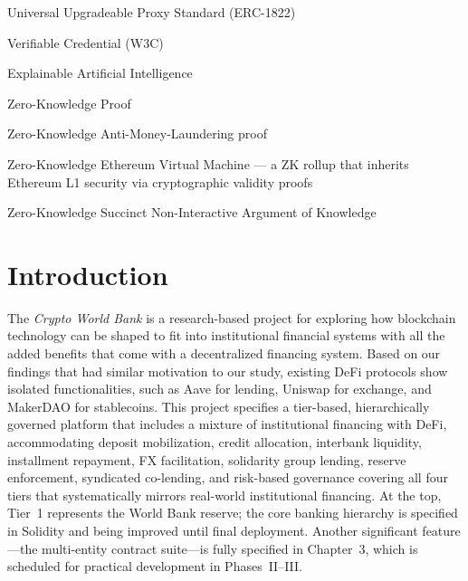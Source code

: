 \documentclass[12pt, a4paper]{report}
\begin{document}
\begin{description}[leftmargin=0pt]
    \item[UUPS:] Universal Upgradeable Proxy Standard (ERC-1822)
    \item[VC:] Verifiable Credential (W3C)
    \item[XAI:] Explainable Artificial Intelligence
    \item[ZKP:] Zero-Knowledge Proof
    \item[zkAML:] Zero-Knowledge Anti-Money-Laundering proof
    \item[zkEVM:] Zero-Knowledge Ethereum Virtual Machine --- a ZK rollup that inherits Ethereum L1 security via cryptographic validity proofs
    \item[zk-SNARK:] Zero-Knowledge Succinct Non-Interactive Argument of Knowledge
\end{description}
\newpage
{}
\setcounter{page}{1}

\chapter{Introduction}
\label{sec:intro}

The \textit{Crypto World Bank} is a research-based project for exploring how blockchain technology can be shaped to fit into institutional financial systems with all the added benefits that come with a decentralized financing system. Based on our findings that had similar motivation to our study, existing DeFi protocols show isolated functionalities, such as Aave for lending, Uniswap for exchange, and MakerDAO for stablecoins. This project specifies a tier-based, hierarchically governed platform that includes a mixture of institutional financing with DeFi, accommodating deposit mobilization, credit allocation, interbank liquidity, installment repayment, FX facilitation, solidarity group lending, reserve enforcement, syndicated co-lending, and risk-based governance covering all four tiers that systematically mirrors real-world institutional financing. At the top, Tier~1 represents the World Bank reserve; the core banking hierarchy is specified in Solidity and being improved until final deployment. Another significant feature---the multi-entity contract suite---is fully specified in Chapter~3, which is scheduled for practical development in Phases~II--III.
\end{document}
